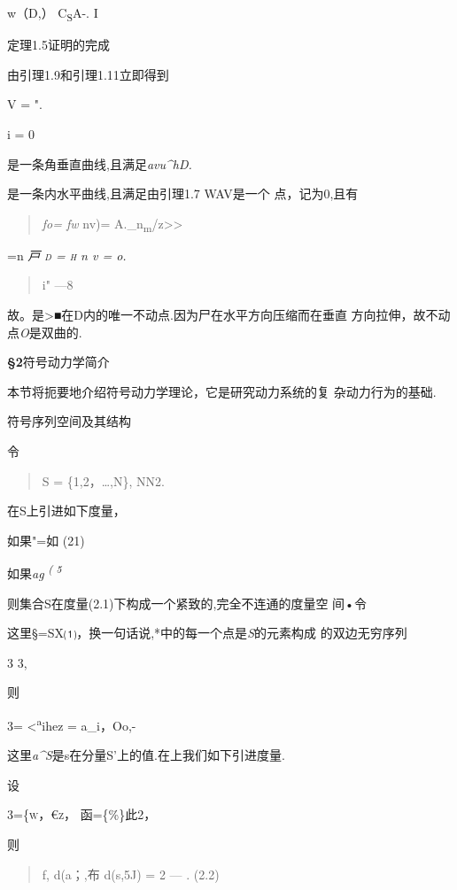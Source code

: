 \documentclass{article}
\begin{document}
w（D,） C\textsubscript{S}A-. I

定理1.5证明的完成

由引理1.9和引理1.11立即得到

V = ".

i = 0

是一条角垂直曲线,且满足\emph{avu\^{}hD.}

是一条内水平曲线,且满足由引理1.7 WAV是一个 点，记为0,且有

\begin{quote}
\emph{fo= fw} nv)= A.\_n\textsubscript{m}/z\textgreater{}\textgreater{}
\end{quote}

=n \emph{戸 \textsc{d = h} n v = o.}

\begin{quote}
i" ---8
\end{quote}

故。是\textgreater{}■在D内的唯一不动点.因为尸在水平方向压缩而在垂直
方向拉伸，故不动点\emph{O}是双曲的.

\protect\hypertarget{bookmark184}{}{}\textbf{§2}符号动力学简介

本节将扼要地介绍符号动力学理论，它是研究动力系统的复 杂动力行为的基础.

符号序列空间及其结构

令

\begin{quote}
S = \{1,2，\ldots{},N\}, NN2.
\end{quote}

在S上引进如下度量，

如果"=如 (21)

如果\emph{ag \textsuperscript{( 5}}

则集合S在度量(2.1)下构成一个紧致的,完全不连通的度量空 间•令

这里§=SX⑴，换一句话说,*中的每一个点是\emph{S}的元素构成 的双边无穷序列

3 3,

则

3= \textless{}\textsuperscript{a}ihez = a\_i，Oo,-

这里\emph{a\^{}S}是s在分量S'上的值.在上我们如下引进度量.

设

\textsc{3=\{w，€z，} 函=\{\%\}此2，

则

\begin{quote}
f, d(a；,布 d(s,5J) = 2 --- . (2.2)
\end{quote}
\end{document}

